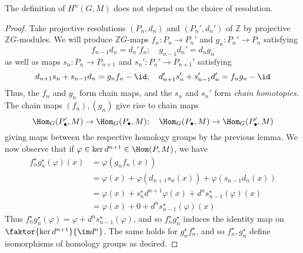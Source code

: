 \begin{theorem}
    The definition of \( H^n(G, M) \) does not depend on the choice of resolution.
\end{theorem}
\begin{proof}
    Take projective resolutions \( (P_n, d_n) \) and \( (P_n', d_n') \) of \( \mathbb Z \) by projective \( \mathbb Z G \)-modules.
    We will produce \( \mathbb Z G \)-maps \( f_n : P_n \to P_n' \) and \( g_n : P_n' \to P_n \) satisfying
    \[ f_{n-1} d_n = d_n' f_n;\quad g_{n-1} d_n' = d_n g_n \]
    as well as maps \( s_n : P_n \to P_{n+1} \) and \( s_n' : P_n' \to P_{n+1}' \) satisfying
    \[ d_{n+1} s_n + s_{n-1} d_n = g_n f_n - \id;\quad d_{n+1}' s_n' + s_{n-1}' d_n' = f_n g_n - \id \]
    Thus, the \( f_n \) and \( g_n \) form chain maps, and the \( s_n \) and \( s_n' \) form \emph{chain homotopies}.
    The chain maps \( (f_n), (g_n) \) give rise to chain maps
    \[ \Hom_G(P_\bullet', M) \to \Hom_G(P_\bullet, M);\quad \Hom_G(P_\bullet, M) \to \Hom_G(P_\bullet', M) \]
    giving maps between the respective homology groups by the previous lemma.
    We now observe that if \( \varphi \in \ker d^{n+1} \in \Hom(P, M) \), we have
    \begin{align*}
        f_n^\star g_n^\star (\varphi)(x) &= \varphi(g_n f_n(x)) \\
        &= \varphi(x) + \varphi(d_{n+1} s_n(x)) + \varphi(s_{n-1} d_n(x)) \\
        &= \varphi(x) + s_n^\star d^{n+1} \varphi(x) + d^n s_{n-1}^\star (\varphi)(x) \\
        &= \varphi(x) + 0 + d^n s_{n-1}^\star (\varphi)(x)
    \end{align*}
    Thus \( f_n^\star g_n^\star(\varphi) = \varphi + d^n s_{n-1}^\star(\varphi) \), and so \( f_n^\star g_n^\star \) induces the identity map on \( \faktor{\ker d^{n+1}}{\im d^n} \).
    The same holds for \( g_n^\star f_n^\star \), and so \( f_n^\star, g_n^\star \) define isomorphisms of homology groups as desired.


\end{proof}
